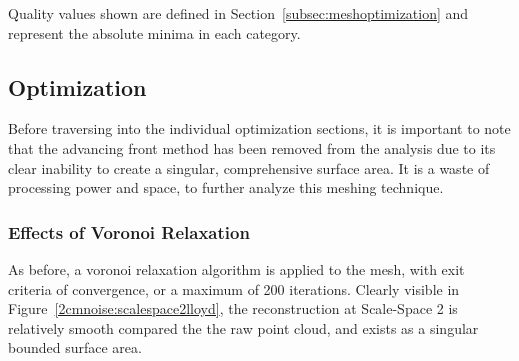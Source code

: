 \documentclass[12pt]{drexelthesis}
\let\Oldsubsection\subsection
\renewcommand{\subsection}{\FloatBarrier\Oldsubsection}
\let\Oldsubsubsection\subsubsection
\renewcommand{\subsubsection}{\FloatBarrier\Oldsubsubsection}
\begin{document}
\begin{table}[!ht]
	\centering
		\caption[Two centimeter noise induced initial mesh quality]{Initial quality analysis of simulated 2 centimeter noise surface mesh.}
	Quality values shown are defined in Section~\ref{subsec:meshoptimization} and represent the absolute minima in each category.
	\label{table:2cmnoiseInit}
\end{table}



\subsection{Optimization}

Before traversing into the individual optimization sections, it is important to note that the advancing front method has been removed from the analysis due to its clear inability to create a singular, comprehensive surface area. It is a waste of processing power and space, to further analyze this meshing technique.

\subsubsection{Effects of Voronoi Relaxation}

As before, a voronoi relaxation algorithm is applied to the mesh, with exit criteria of convergence, or a maximum of 200 iterations. Clearly visible in Figure~\ref{2cmnoise:scalespace2lloyd}, the reconstruction at Scale-Space 2 is relatively smooth compared the the raw point cloud, and exists as a singular bounded surface area.
\end{document}

